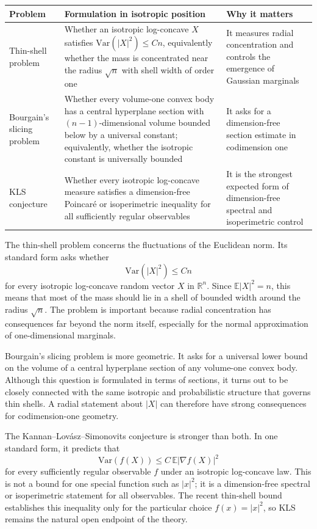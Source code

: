 \documentclass[10pt]{article}
\begin{document}
\begin{center}
\begin{tabularx}{0.98\textwidth}{>{\raggedright\arraybackslash}p{} >{\raggedright\arraybackslash}X >{\raggedright\arraybackslash}p{}}
\toprule
Problem & Formulation in isotropic position & Why it matters \\
\midrule
Thin-shell problem & Whether an isotropic log-concave $X$ satisfies $\mathrm{Var}(|X|^2)\leq Cn$, equivalently whether the mass is concentrated near the radius $\sqrt{n}$ with shell width of order one & It measures radial concentration and controls the emergence of Gaussian marginals \\
\addlinespace
Bourgain's slicing problem & Whether every volume-one convex body has a central hyperplane section with $(n-1)$-dimensional volume bounded below by a universal constant; equivalently, whether the isotropic constant is universally bounded & It asks for a dimension-free section estimate in codimension one \\
\addlinespace
KLS conjecture & Whether every isotropic log-concave measure satisfies a dimension-free Poincar\'e or isoperimetric inequality for all sufficiently regular observables & It is the strongest expected form of dimension-free spectral and isoperimetric control \\
\bottomrule
\end{tabularx}
\end{center}

The thin-shell problem concerns the fluctuations of the Euclidean norm. Its standard form asks whether
\[
\mathrm{Var}(|X|^2)\leq Cn
\]
for every isotropic log-concave random vector $X$ in $\mathbb{R}^n$. Since $\mathbb{E}|X|^2=n$, this means that most of the mass should lie in a shell of bounded width around the radius $\sqrt{n}$. The problem is important because radial concentration has consequences far beyond the norm itself, especially for the normal approximation of one-dimensional marginals.

Bourgain's slicing problem is more geometric. It asks for a universal lower bound on the volume of a central hyperplane section of any volume-one convex body. Although this question is formulated in terms of sections, it turns out to be closely connected with the same isotropic and probabilistic structure that governs thin shells. A radial statement about $|X|$ can therefore have strong consequences for codimension-one geometry.

The Kannan--Lov\'asz--Simonovits conjecture \cite{KLS95} is stronger than both. In one standard form, it predicts that
\[
\mathrm{Var}(f(X))\leq C\,\mathbb{E}|\nabla f(X)|^2
\]
for every sufficiently regular observable $f$ under an isotropic log-concave law. This is not a bound for one special function such as $|x|^2$; it is a dimension-free spectral or isoperimetric statement for all observables. The recent thin-shell bound establishes this inequality only for the particular choice $f(x)=|x|^2$, so KLS remains the natural open endpoint of the theory.
\end{document}
